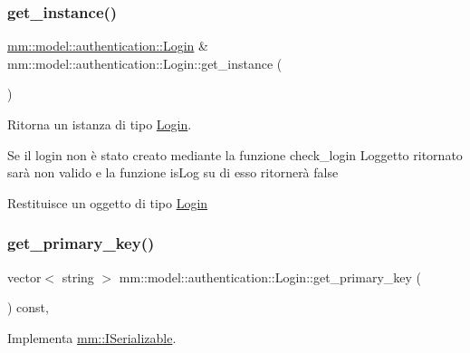 \subsubsection{\texorpdfstring{get\+\_\+instance()}{get\_instance()}}
{\footnotesize\ttfamily \mbox{\hyperlink{structmm_1_1model_1_1authentication_1_1_login}{mm\+::model\+::authentication\+::\+Login}} \& mm\+::model\+::authentication\+::\+Login\+::get\+\_\+instance (\begin{DoxyParamCaption}{ }\end{DoxyParamCaption})\hspace{0.3cm}{\ttfamily [static]}}



Ritorna un istanza di tipo \mbox{\hyperlink{structmm_1_1model_1_1authentication_1_1_login}{Login}}. 

Se il login non è stato creato mediante la funzione check\+\_\+login L\textquotesingle{}oggetto ritornato sarà non valido e la funzione is\+Log su di esso ritornerà false

\begin{DoxyReturn}{Restituisce}
un oggetto di tipo \mbox{\hyperlink{structmm_1_1model_1_1authentication_1_1_login}{Login}} 
\end{DoxyReturn}
\mbox{\label{structmm_1_1model_1_1authentication_1_1_login_a56f5da26be2d64baa78d0c81d99c8221}} 
\subsubsection{\texorpdfstring{get\+\_\+primary\+\_\+key()}{get\_primary\_key()}}
{\footnotesize\ttfamily vector$<$ string $>$ mm\+::model\+::authentication\+::\+Login\+::get\+\_\+primary\+\_\+key (\begin{DoxyParamCaption}{ }\end{DoxyParamCaption}) const\hspace{0.3cm}{\ttfamily [override]}, {\ttfamily [virtual]}}



Implementa \mbox{\hyperlink{classmm_1_1_i_serializable_a69c0c514e11e386b6cb1fbd03f14da17}{mm\+::\+I\+Serializable}}.

